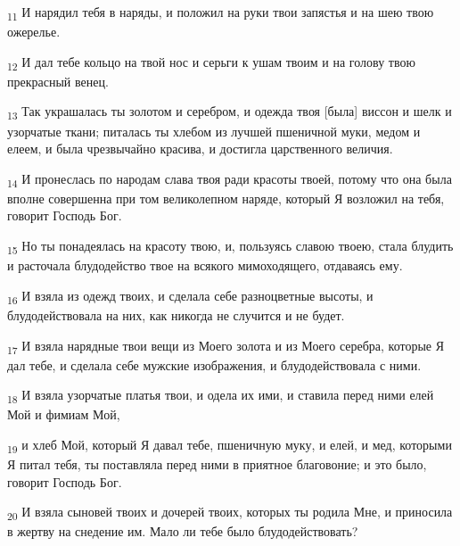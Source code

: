 \begin{tcolorbox}
\textsubscript{11} И нарядил тебя в наряды, и положил на руки твои запястья и на шею твою ожерелье.
\end{tcolorbox}
\begin{tcolorbox}
\textsubscript{12} И дал тебе кольцо на твой нос и серьги к ушам твоим и на голову твою прекрасный венец.
\end{tcolorbox}
\begin{tcolorbox}
\textsubscript{13} Так украшалась ты золотом и серебром, и одежда твоя [была] виссон и шелк и узорчатые ткани; питалась ты хлебом из лучшей пшеничной муки, медом и елеем, и была чрезвычайно красива, и достигла царственного величия.
\end{tcolorbox}
\begin{tcolorbox}
\textsubscript{14} И пронеслась по народам слава твоя ради красоты твоей, потому что она была вполне совершенна при том великолепном наряде, который Я возложил на тебя, говорит Господь Бог.
\end{tcolorbox}
\begin{tcolorbox}
\textsubscript{15} Но ты понадеялась на красоту твою, и, пользуясь славою твоею, стала блудить и расточала блудодейство твое на всякого мимоходящего, отдаваясь ему.
\end{tcolorbox}
\begin{tcolorbox}
\textsubscript{16} И взяла из одежд твоих, и сделала себе разноцветные высоты, и блудодействовала на них, как никогда не случится и не будет.
\end{tcolorbox}
\begin{tcolorbox}
\textsubscript{17} И взяла нарядные твои вещи из Моего золота и из Моего серебра, которые Я дал тебе, и сделала себе мужские изображения, и блудодействовала с ними.
\end{tcolorbox}
\begin{tcolorbox}
\textsubscript{18} И взяла узорчатые платья твои, и одела их ими, и ставила перед ними елей Мой и фимиам Мой,
\end{tcolorbox}
\begin{tcolorbox}
\textsubscript{19} и хлеб Мой, который Я давал тебе, пшеничную муку, и елей, и мед, которыми Я питал тебя, ты поставляла перед ними в приятное благовоние; и это было, говорит Господь Бог.
\end{tcolorbox}
\begin{tcolorbox}
\textsubscript{20} И взяла сыновей твоих и дочерей твоих, которых ты родила Мне, и приносила в жертву на снедение им. Мало ли тебе было блудодействовать?
\end{tcolorbox}
